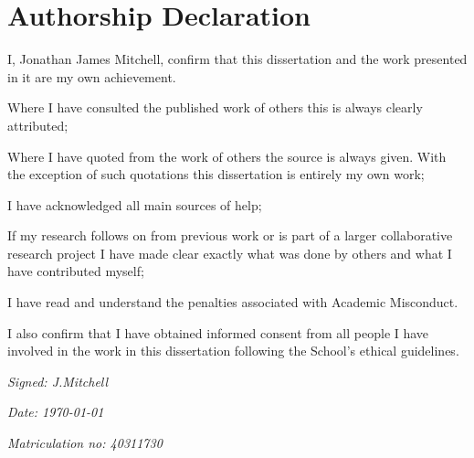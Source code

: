 
\section*{Authorship Declaration}
\vspace{0.5cm}
\begin{flushleft}
I, Jonathan James Mitchell, confirm that this dissertation and the work presented in it are my own achievement.\newline

Where I have consulted the published work of others this is always clearly attributed;\newline

Where I have quoted from the work of others the source is always given. With the exception of such quotations this dissertation is entirely my own work;\newline

I have acknowledged all main sources of help; \newline

If my research follows on from previous work or is part of a larger collaborative research project I have made clear exactly what was done by others and what I have contributed myself;\newline

I have read and understand the penalties associated with Academic Misconduct.\newline

I also confirm that I have obtained informed consent from all people I have involved in the work in this dissertation following the School's ethical guidelines.\newline
\end{flushleft}

\begin{flushleft} \large
\emph{Signed: J.Mitchell} \\
\end{flushleft}

\vspace{.5cm}

\begin{flushleft} \large
\emph{Date: \today} \\
\end{flushleft}

\vspace{.5cm}

\begin{flushleft} \large
\emph{Matriculation no: 40311730}  \\
\end{flushleft}